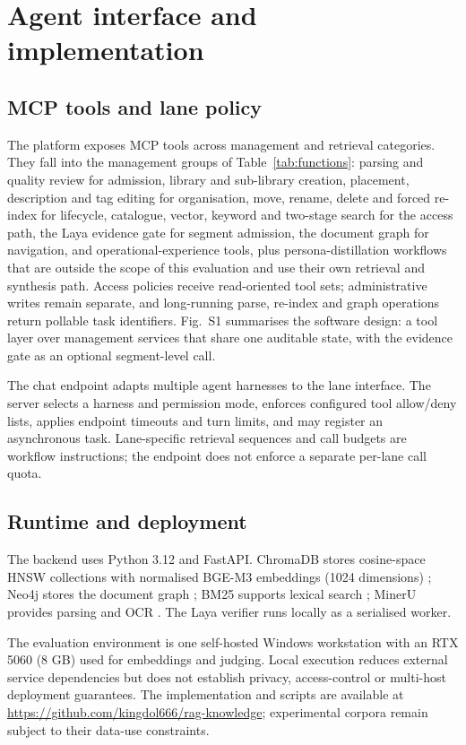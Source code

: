 \section{Agent interface and implementation}
\label{sec:implementation}
\label{sec:impl}

\subsection{MCP tools and lane policy}
\label{sec:impl-tools}

The platform exposes MCP tools across management and retrieval categories. They
fall into the management groups of Table~\ref{tab:functions}: parsing and
quality review for admission, library and sub-library creation, placement,
description and tag editing for organisation, move, rename, delete and
forced re-index for lifecycle, catalogue, vector, keyword and two-stage
search for the access path, the Laya evidence gate for segment admission,
the document graph for navigation, and operational-experience tools, plus
persona-distillation workflows that are outside the scope of this evaluation
and use their own retrieval and synthesis path.
Access policies
receive read-oriented tool sets; administrative writes remain separate, and
long-running parse, re-index and graph operations return pollable task
identifiers. Fig.~S1 summarises the software design: a tool
layer over management services that share one auditable state, with the
evidence gate as an optional segment-level call.



The chat endpoint adapts multiple agent harnesses to the lane interface. The
server selects a harness and permission mode, enforces configured tool
allow/deny lists, applies endpoint timeouts and turn limits, and may register an
asynchronous task. Lane-specific retrieval sequences and call budgets are
workflow instructions; the endpoint does not enforce a separate per-lane call
quota.

\subsection{Runtime and deployment}
\label{sec:impl-runtime}

The backend uses Python 3.12 and FastAPI. ChromaDB stores cosine-space HNSW
collections with normalised BGE-M3 embeddings (1024 dimensions)
\cite{chroma,hnsw,bge-m3}; Neo4j stores the document graph \cite{neo4j};
BM25 supports lexical search \cite{bm25}; MinerU provides parsing and OCR
\cite{mineru}. The Laya verifier runs locally as a serialised worker.

The evaluation environment is one self-hosted Windows workstation with an
RTX 5060 (8 GB) used for embeddings and judging. Local execution reduces
external service dependencies but does not establish privacy, access-control or
multi-host deployment guarantees. The implementation and scripts are available
at \url{https://github.com/kingdol666/rag-knowledge}; experimental corpora
remain subject to their data-use constraints.
